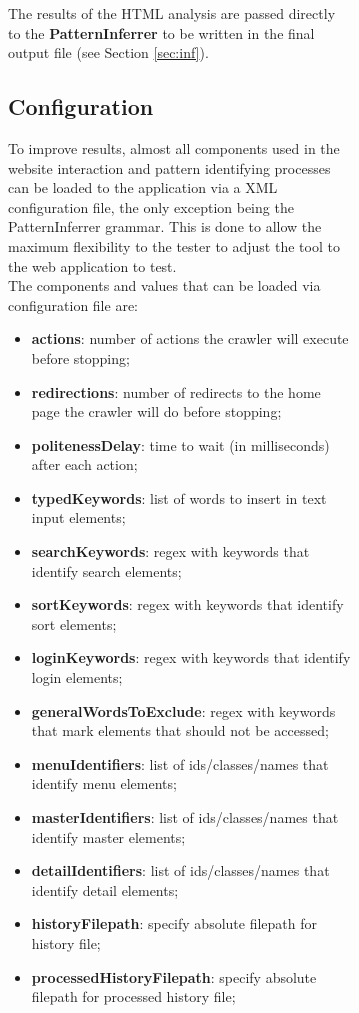 \documentclass[conference]{IEEEtran}
\begin{document}
\begin{enumerate}
\begin{figure}[!htb]
\begin{itemize}
\begin{figure}[!htb]
\begin{itemize}
The results of the HTML analysis are passed directly to the \textbf{PatternInferrer} to be written in the final output file (see Section \ref{sec:inf}).\\

\subsection{Configuration}\label{sec:conf}
To improve results, almost all components used in the website interaction and pattern identifying processes can be loaded to the application via a XML configuration file, the only exception being the PatternInferrer grammar. This is done to allow the maximum flexibility to the tester to adjust the tool to the web application to test.\\

The components and values that can be loaded via configuration file are: 
\begin{itemize}
\item[] \textbf{actions}: number of actions the crawler will execute before stopping;
\item[] \textbf{redirections}: number of redirects to the home page the crawler will do before stopping; 
\item[] \textbf{politenessDelay}: time to wait (in milliseconds) after each action;
\item[] \textbf{typedKeywords}: list of words to insert in text input elements;
\item[] \textbf{searchKeywords}: regex with keywords that identify search elements;
\item[] \textbf{sortKeywords}: regex with keywords that identify sort elements;
\item[] \textbf{loginKeywords}: regex with keywords that identify login elements;
\item[] \textbf{generalWordsToExclude}: regex with keywords that mark elements that should not be accessed;
\item[] \textbf{menuIdentifiers}: list of ids/classes/names that identify menu elements;
\item[] \textbf{masterIdentifiers}: list of ids/classes/names that identify master elements;
\item[] \textbf{detailIdentifiers}: list of ids/classes/names that identify detail elements;
\item[] \textbf{historyFilepath}: specify absolute filepath for history file;
\item[] \textbf{processedHistoryFilepath}: specify absolute filepath for processed history file;

\end{itemize}
\end{itemize}
\end{figure}
\end{itemize}
\end{figure}
\end{enumerate}
\end{document}

